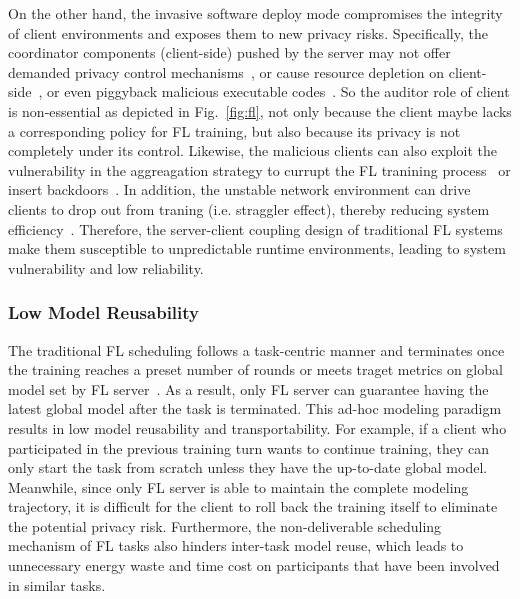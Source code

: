 On the other hand, the invasive software deploy mode compromises the integrity of client environments and exposes them to new privacy risks.
Specifically, the coordinator components (client-side) pushed by the server may not offer demanded privacy control mechanisms~\cite{zeng2023fedlab, caldas2018leaf, mcmahan2017communication}, or cause resource depletion on client-side~\cite{bonawitz2019towards, niu2020billion, chen2020deep}, or even piggyback malicious executable codes~\cite{li2017understanding}.
So the auditor role of client is non-essential as depicted in Fig.~\ref{fig:fl}, not only because the client maybe lacks a corresponding policy for FL training, but also because its privacy is not completely under its control.
Likewise, the malicious clients can also exploit the vulnerability in the aggreagation strategy to currupt the FL tranining process~\cite{bouacida2021vulnerabilities, sattler2020byzantine, park2021sageflow, fang2020local} or insert backdoors~\cite{bagdasaryan2020backdoor, wang2020attack}.
In addition, the unstable network environment can drive clients to drop out from traning (i.e. straggler effect), thereby reducing system efficiency~\cite{reisizadeh2019robust, park2021sageflow}.
Therefore, the server-client coupling design of traditional FL systems make them susceptible to unpredictable runtime environments, leading to system vulnerability and low reliability.

\subsubsection{Low Model Reusability} %
The traditional FL scheduling follows a task-centric manner and terminates once the training reaches a preset number of rounds or meets traget metrics on global model set by FL server~\cite{bonawitz2019towards}.
As a result, only FL server can guarantee having the latest global model after the task is terminated.
This ad-hoc modeling paradigm results in low model reusability and transportability.
For example, if a client who participated in the previous training turn wants to continue training, they can only start the task from scratch unless they have the up-to-date global model.
Meanwhile, since only FL server is able to maintain the complete modeling trajectory, it is difficult for the client to roll back the training itself to eliminate the potential privacy risk.
Furthermore, the non-deliverable scheduling mechanism of FL tasks also hinders inter-task model reuse, which leads to unnecessary energy waste and time cost on participants that have been involved in similar tasks.

